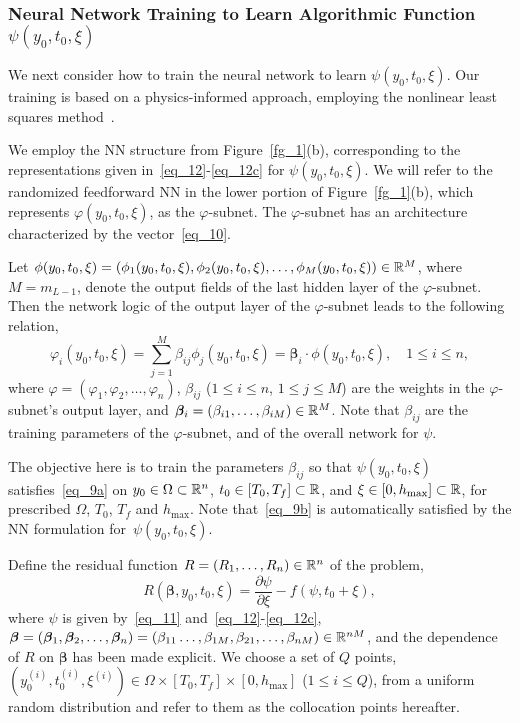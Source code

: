 \subsubsection{Neural Network Training to Learn Algorithmic Function $\psi(y_0,t_0,\xi)$}
\label{sec_222}


We next consider how to train the neural network to learn $\psi(y_0,t_0,\xi)$.
Our training is based on a physics-informed approach, 
employing the nonlinear least squares method~\cite{Bjorck1996}.

We employ the NN structure from Figure~\ref{fg_1}(b), corresponding to
the representations given in~\eqref{eq_12}-\eqref{eq_12c} for $\psi(y_0,t_0,\xi)$.
We will refer to the randomized feedforward NN in
the lower portion of Figure~\ref{fg_1}(b),
which represents $\varphi(y_0,t_0,\xi)$, as the $\varphi$-subnet.
The $\varphi$-subnet has an architecture characterized by the vector~\eqref{eq_10}.

Let $\phi(y_0,t_0,\xi)=(\phi_1(y_0,t_0,\xi),\phi_2(y_0,t_0,\xi),\dots,\phi_M(y_0,t_0,\xi))\in\mathbb{R}^M$,
where $M=m_{L-1}$, denote the output fields of the last hidden layer of
the $\varphi$-subnet. Then the network logic of
the output layer of the $\varphi$-subnet leads to
the following relation,
\begin{equation}\label{eq_13}
  \varphi_i(y_0,t_0,\xi) = \sum_{j=1}^M\beta_{ij}\phi_j(y_0,t_0,\xi) = \bm\beta_i\cdot\phi(y_0,t_0,\xi),
  \quad 1\leqslant i\leqslant n,
\end{equation}
where $\varphi = (\varphi_1,\varphi_2,\dots,\varphi_n)$,
$\beta_{ij}$ ($1\leqslant i\leqslant n$, $1\leqslant j\leqslant M$)
are the weights in the $\varphi$-subnet's output layer,
and $\bm\beta_i = (\beta_{i1},\dots,\beta_{iM})\in\mathbb{R}^M$.
Note that $\beta_{ij}$ are the training parameters of the $\varphi$-subnet,
and of the overall network for $\psi$.

The objective here is to train the parameters $\beta_{ij}$ so that $\psi(y_0,t_0,\xi)$
satisfies~\eqref{eq_9a} on $y_0\in\Omega\subset\mathbb{R}^n$, $t_0\in[T_0,T_f]\subset\mathbb{R}$,
and $\xi\in[0,h_{\max}]\subset\mathbb{R}$, for prescribed $\Omega$, $T_0$, $T_f$ and $h_{\max}$.
Note that~\eqref{eq_9b}
is automatically satisfied by the NN formulation for~$\psi(y_0,t_0,\xi)$.


Define the residual function $R=(R_1,\dots,R_n)\in\mathbb{R}^{n}$ of the problem,
\begin{equation}\label{eq_14}
  R(\bm\beta,y_0,t_0,\xi) = \frac{\partial\psi}{\partial \xi} - f(\psi,t_0+\xi),
\end{equation}
where $\psi$ is given by~\eqref{eq_11} and~\eqref{eq_12}-\eqref{eq_12c},
$\bm\beta = (\bm\beta_1,\bm\beta_2,\dots,\bm\beta_n)
= (\beta_{11}\dots,\beta_{1M}, \beta_{21},\dots,\beta_{nM})\in\mathbb{R}^{nM}$,
and the dependence of $R$ on $\bm\beta$ has been made explicit.
We choose a set of $Q$ points,
$(y_0^{(i)},t_0^{(i)},\xi^{(i)})\in\Omega\times[T_0,T_f]\times[0,h_{\max}]$ ($1\leqslant i\leqslant Q$),
from a uniform random distribution and refer to them
as the collocation points hereafter.


